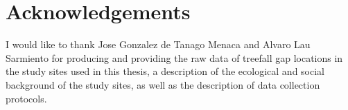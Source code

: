 \documentclass[a4paper,12pt]{scrbook}
\begin{document}
\chapter{Acknowledgements}

I would like to thank Jose Gonzalez de Tanago Menaca and Alvaro Lau Sarmiento for producing and providing the raw data of treefall gap locations in the study sites used in this thesis, a description of the ecological and social background of the study sites, as well as the description of data collection protocols.

\printnoidxglossary[type=acronym]


\end{document}
